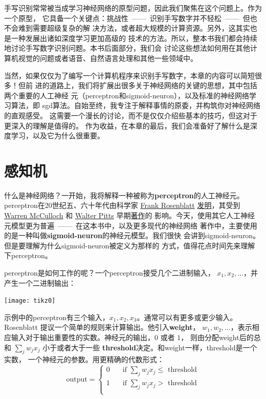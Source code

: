 手写识别常常被当成学习神经网络的原型问题，因此我们聚焦在这个问题上。作为一个原型，
它具备一个关键点：挑战性~——~识别手写数字并不轻松~——~但也不会难到需要超级复杂的解
决方法，或者超大规模的计算资源。另外，这其实也是一种发展出诸如深度学习更加高级的
技术的方法。所以，整本书我们都会持续地讨论手写数字识别问题。本书后面部分，我们会
讨论这些想法如何用在其他计算机视觉的问题或者语音、自然语言处理和其他一些领域中。

当然，如果仅仅为了编写一个计算机程序来识别手写数字，本章的内容可以简短很多！但前
进的道路上，我们将扩展出很多关于神经网络的关键的思想，其中包括两个重要的人工神经
元（\gls*{perceptron}和\gls*{sigmoid-neuron}），以及标准的神经网络学习算法，即%
\gls*{sgd}算法。自始至终，我专注于解释事情的原委，并构筑你对神经网络的直观感受。
这需要一个漫长的讨论，而不是仅仅介绍些基本的技巧，但这对于更深入的理解是值得的。
作为收益，在本章的最后，我们会准备好了解什么是深度学习，以及它为什么很重要。

\section{感知机}
\label{sec:Perceptrons}

什么是神经网络？一开始，我将解释一种被称为\textbf{\gls{perceptron}}的人工神经元。%
\gls*{perceptron}在20世纪五、六十年代由科学家
\href{http://en.wikipedia.org/wiki/Frank_Rosenblatt}{Frank Rosenblatt}
\href{http://books.google.ca/books/about/Principles_of_neurodynamics.html?id=7FhRAAAAMAAJ}{%
  发明}，其受到 \href{http://en.wikipedia.org/wiki/Warren_McCulloch}{Warren
  McCulloch} 和 \href{http://en.wikipedia.org/wiki/Walter_Pitts}{Walter Pitts}
早期\href{http://scholar.google.ca/scholar?cluster=4035975255085082870}{著作}的
影响。今天，使用其它人工神经元模型更为普遍~——~在这本书中，以及更多现代的神经网络
著作中，主要使用的是一种叫做\textbf{\gls{sigmoid-neuron}}的神经元模型。我们很快
会讲到\gls*{sigmoid-neuron}。但是要理解为什么\gls*{sigmoid-neuron}被定义为那样的
方式，值得花点时间先来理解下\gls*{perceptron}。

\gls*{perceptron}是如何工作的呢？一个\gls*{perceptron}接受几个二进制输入，
$x_1,x_2,\ldots$，并产生一个二进制输出：
\begin{center}
  \texttt{[image: tikz0]}
\end{center}

示例中的\gls*{perceptron}有三个输入，$x_1,x_2,x_3$。通常可以有更多或更少输入。
Rosenblatt 提议一个简单的规则来计算输出。他引入\textbf{\gls{weight}}，
$w_1,w_2,\ldots$，表示相应输入对于输出重要性的实数。神经元的输出，$0$ 或者 $1$，
则由分配\gls*{weight}后的总和 $\sum_j w_j x_j$ 小于或者大于一些%
\textbf{\gls{threshold}}决定。和\gls*{weight}一样，\gls*{threshold}是一个实数，
一个神经元的参数。用更精确的代数形式：
\begin{equation}
  \text{output} = \begin{cases}
    0 & \quad \text{if } \sum_j w_j x_j \leq \text{ threshold} \\
    1 & \quad \text{if } \sum_j w_j x_j > \text{ threshold} \\
  \end{cases}
  \tag{1}
\end{equation}

